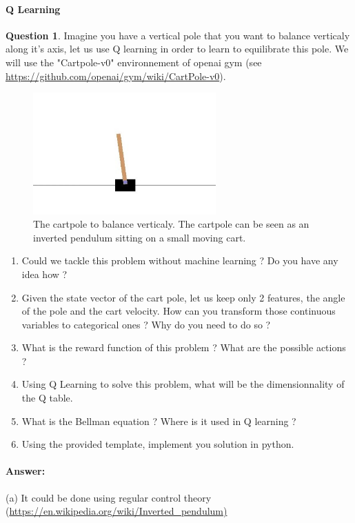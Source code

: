 \documentclass[11pt,a4paper]{article}
\theoremstyle{definition}%
\newtheorem{Q}{Question}[] %
\newcommand{\reponse}[1]{%
\ifthenelse {\boolean{corrige}} {\paragraph{Answer:} \color{darkblue}   #1\color{black}} {}
}
\begin{document}
\paragraph{Q Learning}
\begin{Q}
Imagine you have a vertical pole that you want to balance verticaly along it's axis,
let us use Q learning in order to learn to equilibrate this pole. We will use the "Cartpole-v0"
environnement of openai gym (see \url{https://github.com/openai/gym/wiki/CartPole-v0}).

\begin{figure}[h]
    \centering
\includegraphics[width=7cm]{cartpole.jpg}
    \caption{The cartpole to balance verticaly. The cartpole can be seen as an inverted pendulum
    sitting on a small moving cart.}
\end{figure}

\begin{enumerate}
    \item Could we tackle this problem without machine learning ? Do you have any idea how ?
    \item Given the state vector of the cart pole, let us keep only 2 features, the angle of the
        pole and the cart velocity. How can you transform those continuous variables to
        categorical ones ? Why do you need to do so ?
    \item What is the reward function of this problem ? What are the possible actions ?
    \item Using Q Learning to solve this problem, what will be the dimensionnality of the Q table.
    \item What is the Bellman equation ? Where is it used in Q learning ?
    \item Using the provided template, implement you solution in python. 

\end{enumerate}

\reponse{
    (a) It could be done using regular control theory (\url{https://en.wikipedia.org/wiki/Inverted_pendulum)}\\

}
\end{Q}
\end{document}

